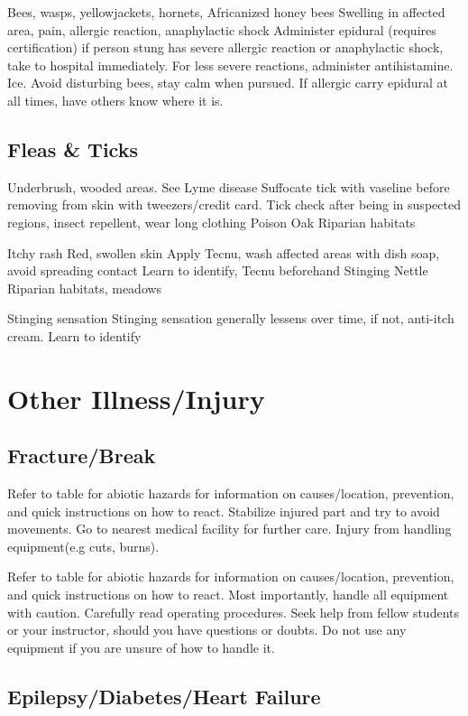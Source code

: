 \documentclass[12pt]{../SOP3_beta}\usepackage[]{graphicx}\usepackage[]{color}
\begin{document}
Bees, wasps, yellowjackets, hornets, Africanized honey bees
Swelling in affected area, pain, allergic reaction, anaphylactic shock
Administer epidural (requires certification) if person stung has severe allergic reaction or anaphylactic shock, take to hospital immediately. For less severe reactions, administer antihistamine. Ice.
Avoid disturbing bees, stay calm when pursued. If allergic carry epidural at all times, have others know where it is.

\subsection{Fleas \& Ticks}

Underbrush, wooded areas.
See Lyme disease
Suffocate tick with vaseline before removing from skin with tweezers/credit card.
Tick check after being in suspected regions, insect repellent, wear long clothing
Poison Oak
Riparian habitats

Itchy rash
Red, swollen skin
Apply Tecnu, wash affected areas with dish soap, avoid spreading contact
Learn to identify, Tecnu beforehand
Stinging Nettle
Riparian habitats, meadows

Stinging sensation
Stinging sensation generally lessens over time, if not, anti-itch cream.
Learn to identify


\section{Other Illness/Injury}

\subsection{Fracture/Break}

\NP Refer to table for abiotic hazards for information on causes/location, prevention, and quick instructions on how to react. Stabilize injured part and try to avoid movements. Go to nearest medical facility for further care.
Injury from handling equipment(e.g cuts, burns).


\NP Refer to table for abiotic hazards for information on causes/location, prevention, and quick instructions on how to react. Most importantly, handle all equipment with caution. Carefully read operating procedures. Seek help from fellow students or your instructor, should you have questions or doubts. Do not use any equipment if you are unsure of how to handle it. 

\subsection{Epilepsy/Diabetes/Heart Failure}
\end{document}
